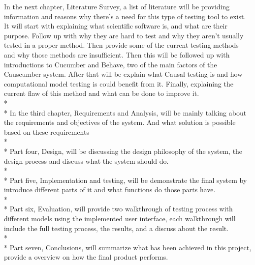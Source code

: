 In the next chapter, Literature Survey, a list of literature will be providing information and reasons why there’s a need for this type of testing tool to exist. It will start with explaining what scientific software is, and what are their purpose. Follow up with why they are hard to test and why they aren’t usually tested in a proper method. Then provide some of the current testing methods and why those methods are insufficient. Then this will be followed up with introductions to Cucumber and Behave, two of the main factors of the Causcumber system. After that will be explain what Causal testing is and how computational model testing is could benefit from it. Finally, explaining the current flaw of this method and what can be done to improve it.\\* \\* 
In the third chapter, Requirements and Analysis, will be mainly talking about the requirements and objectives of the system. And what solution is possible based on these requirements\\* \\*
Part four, Design, will be discussing the design philosophy of the system, the design process and discuss what the system should do. \\* \\*
Part five, Implementation and testing, will be demonstrate the final system by introduce different parts of it and what functions do those parts have. \\* \\*
Part six, Evaluation, will provide two walkthrough of testing process with different models using the implemented user interface, each walkthrough will include the full testing process, the results, and a discuss about the result.\\* \\*
Part seven, Conclusions, will summarize what has been achieved in this project, provide a overview on how the final product performs.






